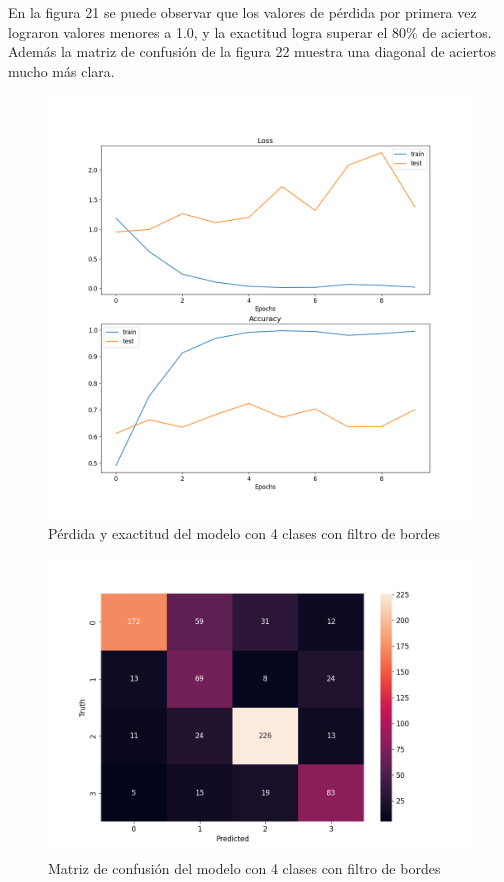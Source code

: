 En la figura 21 se puede observar que los valores de pérdida por primera vez lograron valores menores a 1.0, y la exactitud logra superar el 80\% de aciertos. Además la matriz de confusión de la figura 22 muestra una diagonal de aciertos mucho más clara. 

\begin{figure}[H]
	\centering
	\includegraphics[scale=0.65]{figures/LA7.png}
	\caption{Pérdida y exactitud del modelo con 4 clases con filtro de bordes}
	\label{fig:img23}
\end{figure}

\begin{figure}[H]
	\centering
	\includegraphics[scale=0.75]{figures/CM7.png}
	\caption{Matriz de confusión del modelo con 4 clases con filtro de bordes}
	\label{fig:img24}
\end{figure}

